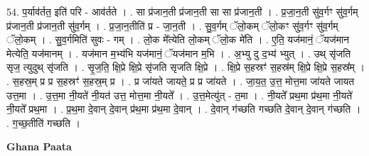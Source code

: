\documentclass[17pt]{extarticle}
\begin{document}
54. प॒र्याव॑र्तत॒ इति॑ परि - आव॑र्तते । . सा प्र॑जान॒ती प्र॑जान॒ती सा सा प्र॑जान॒ती । . प्र॒जा॒न॒ती सु॑व॒र्गꣳ सु॑व॒र्गम् प्र॑जान॒ती प्र॑जान॒ती सु॑व॒र्गम् । . प्र॒जा॒न॒तीति॑ प्र - जा॒न॒ती । . सु॒व॒र्गम् ॅलो॒कम् ॅलो॒कꣳ सु॑व॒र्गꣳ सु॑व॒र्गम् ॅलो॒कम् । . सु॒व॒र्गमिति॑ सुवः - गम् । . लो॒क मे᳚त्येति लो॒कम् ॅलो॒क मे॑ति । . ए॒ति॒ यज॑मानं॒ ॅयज॑मान मेत्येति॒ यज॑मानम् । . यज॑मान म॒भ्य॑भि यज॑मानं॒ ॅयज॑मान म॒भि । . अ॒भ्यु दु द॒भ्य॑ भ्युत् । . उथ् सृ॑जति सृज॒ त्युदुथ् सृ॑जति । . सृ॒ज॒ति॒ क्षि॒प्रे क्षि॒प्रे सृ॑जति सृजति क्षि॒प्रे । . क्षि॒प्रे स॒हस्रꣳ॑ स॒हस्र॑म् क्षि॒प्रे क्षि॒प्रे स॒हस्र᳚म् । . स॒हस्र॒म् प्र प्र स॒हस्रꣳ॑ स॒हस्र॒म् प्र । . प्र जा॑यते जायते॒ प्र प्र जा॑यते । . जा॒य॒त॒ उ॒त्त॒ मोत्त॒मा जा॑यते जायत उत्त॒मा । . उ॒त्त॒मा नी॒यते॑ नी॒यत॑ उत्त॒ मोत्त॒मा नी॒यते᳚ । . उ॒त्त॒मेत्यु॑त् - त॒मा । . नी॒यते᳚ प्रथ॒मा प्र॑थ॒मा नी॒यते॑ नी॒यते᳚ प्रथ॒मा । . प्र॒थ॒मा दे॒वान् दे॒वान् प्र॑थ॒मा प्र॑थ॒मा दे॒वान् । . दे॒वान् ग॑च्छति गच्छति दे॒वान् दे॒वान् ग॑च्छति । . ग॒च्छ॒तीति॑ गच्छति । \newline

\textbf{Ghana Paata } \newline
\end{document}
